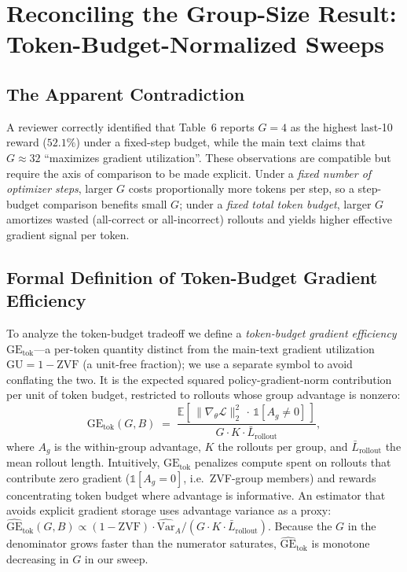 \section{Reconciling the Group-Size Result: Token-Budget-Normalized Sweeps}
\label{sec:appendix:group-size-reconcile}

\subsection{The Apparent Contradiction}

A reviewer correctly identified that Table~6 reports $G{=}4$ as the
highest last-10 reward ($52.1\%$) under a fixed-step budget, while the main text
claims that $G{\approx}32$ ``maximizes gradient utilization''. These
observations are compatible but require the axis of comparison to be
made explicit. Under a \emph{fixed number of optimizer steps}, larger
$G$ costs proportionally more tokens per step, so a step-budget
comparison benefits small $G$; under a \emph{fixed total token budget},
larger $G$ amortizes wasted (all-correct or all-incorrect) rollouts
and yields higher effective gradient signal per token.

\subsection{Formal Definition of Token-Budget Gradient Efficiency}

To analyze the token-budget tradeoff we define a \emph{token-budget gradient
efficiency} $\mathrm{GE}_{\text{tok}}$---a per-token quantity distinct from the
main-text gradient utilization $\mathrm{GU}{=}1{-}\mathrm{ZVF}$ (a unit-free
fraction); we use a separate symbol to avoid conflating the two. It is the
expected squared policy-gradient-norm contribution per unit of token budget,
restricted to rollouts whose group advantage is nonzero:
\begin{equation}
\label{eq:gu}
\mathrm{GE}_{\text{tok}}(G, B) \;=\;
\frac{\displaystyle\mathbb{E}\!\left[\,\|\nabla_\theta \mathcal{L}\|_2^{2}\,\cdot\,
  \mathbb{1}\!\left[A_g \ne 0\right]\,\right]}
{\displaystyle G \cdot K \cdot \bar{L}_\text{rollout}},
\end{equation}
where $A_g$ is the within-group advantage, $K$ the rollouts per group,
and $\bar{L}_\text{rollout}$ the mean rollout length.
Intuitively, $\mathrm{GE}_{\text{tok}}$ penalizes compute spent on rollouts that
contribute zero gradient ($\mathbb{1}[A_g\!=\!0]$, i.e.~ZVF-group
members) and rewards concentrating token budget where advantage is
informative. An estimator that avoids explicit gradient storage uses
advantage variance as a proxy:
$\widehat{\mathrm{GE}}_{\text{tok}}(G,B) \!\propto\!
 (1 - \mathrm{ZVF}) \cdot \widehat{\mathrm{Var}}_A / (G\cdot K \cdot \bar{L}_\text{rollout})$.
Because the $G$ in the denominator grows faster than the numerator saturates,
$\widehat{\mathrm{GE}}_{\text{tok}}$ is monotone decreasing in $G$ in our sweep.

